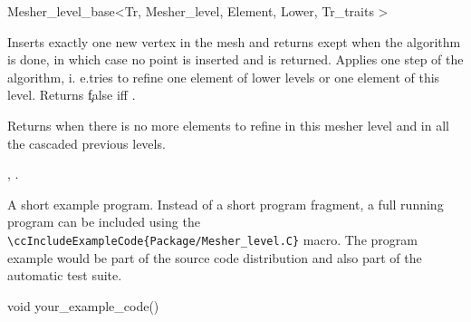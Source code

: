 \begin{ccRefClass}{Mesher_level_base<Tr, Mesher_level, Element, Lower,
Tr_traits >}
 
\begin{ccAdvanced}
 
 {Inserts exactly one new vertex in the mesh  and returns 
 exept when the algorithm is done, in which case no point is inserted
and  is returned.}
\ccGlue  
 {Applies one step of the algorithm, i. e.tries to refine one element of
   lower levels or one element of this level. Returns \c false iff 
   . }

{Returns  when there is no more elements to refine
in this mesher level and in all the cascaded previous levels.}

\end{ccAdvanced}







\ccSeeAlso

,
.

\ccExample

A short example program.
Instead of a short program fragment, a full running program can be
included using the 
\verb|\ccIncludeExampleCode{Package/Mesher_level.C}| 
macro. The program example would be part of the source code distribution and
also part of the automatic test suite.

\begin{ccExampleCode}
void your_example_code() {
}
\end{ccExampleCode}


\end{ccRefClass}



